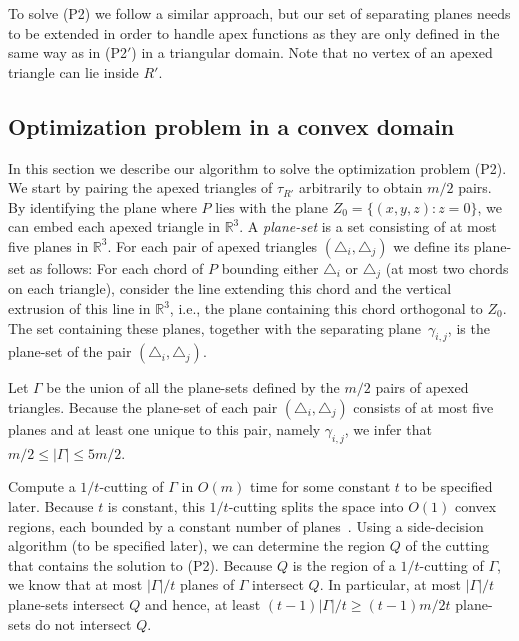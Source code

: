 \documentclass[a4paper]{article}
\newcommand{\reg}{\ensuremath{R'}}
\begin{document}
To solve (P2) we follow a similar approach, but our set of separating planes needs to be extended in order to handle apex functions as they are only defined in the same way as in (P2$'$) in a triangular domain.
Note that no vertex of an apexed triangle can lie inside $\reg$.

\subsection{Optimization problem in a convex domain}
In this section we describe our algorithm to solve the optimization problem (P2). 
We start by pairing the apexed triangles of $\tau_{\reg}$ arbitrarily to obtain $m/2$ pairs.
By identifying the plane where $P$ lies with the plane $Z_0 = \{(x,y,z): z = 0\}$, we can embed each apexed triangle in $\mathbb{R}^3$.
A \emph{plane-set} is a set consisting of at most five planes in $\mathbb{R}^3$.
For each pair of apexed triangles $(\triangle_i, \triangle_j)$ we define its plane-set as follows: 
For each chord of $P$ bounding either $\triangle_i$ or $\triangle_j$ (at most two chords on each triangle), consider the line extending this chord and the vertical extrusion of this line in $\mathbb{R}^3$, i.e., the plane containing this chord orthogonal to $Z_0$. The set containing these planes, together with the separating plane~$\gamma_{i,j}$, is the plane-set of the pair $(\triangle_i, \triangle_j)$.

Let $\Gamma$ be the union of all the plane-sets defined by the $m/2$ pairs of apexed triangles. 
Because the plane-set of each pair $(\triangle_i, \triangle_j)$ consists of at most five planes and at least one unique to this pair, namely $\gamma_{i,j}$, we infer that $m/2\leq |\Gamma| \leq 5m/2$.

Compute a $1/t$-cutting of $\Gamma$ in $O(m)$ time for some constant $t$ to be specified later.
Because $t$ is constant, this $1/t$-cutting splits the space into $O(1)$ convex regions, each bounded by a constant number of planes~\cite{matousekCuttings}. 
Using a side-decision algorithm (to be specified later), we can determine the region $Q$ of the cutting that contains the solution to (P2). Because $Q$ is the region of a $1/t$-cutting of $\Gamma$, we know that at most $|\Gamma|/t$ planes of $\Gamma$ intersect $Q$. 
In particular, at most $|\Gamma|/t$ plane-sets intersect $Q$ and hence, at least $(t-1)|\Gamma|/t \geq (t-1)m/2t$ plane-sets do not intersect $Q$.
\end{document}
